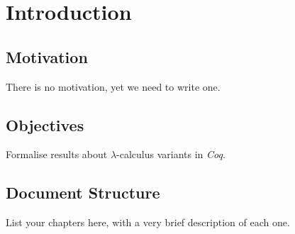 \chapter{Introduction}
\label{c:intro}


\section{Motivation}
\label{s:motivation}
There is no motivation, yet we need to write one.


\section{Objectives}
\label{s:objectives}
Formalise results about $\lambda$-calculus variants in \textit{Coq}.


\section{Document Structure}
\label{s:doc_structure}
List your chapters here, with a very brief description of each one.